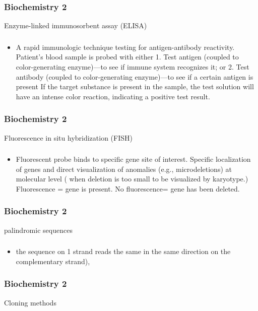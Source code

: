\documentclass[11pt]{beamer}
\begin{document}
\begin{frame}
 \frametitle{Biochemistry 2}
Enzyme-linked immunosorbent assay (ELISA)
\end{frame}

\begin{frame}
 \frametitle{}
\begin{itemize}
\item A rapid immunologic technique testing for antigen-antibody reactivity.
Patient’s blood sample is probed with either 1. Test antigen (coupled to color-generating
enzyme)––to see if immune system
recognizes it; or 2. Test antibody (coupled to color-generating
enzyme)––to see if a certain antigen is
present If the target substance is present in the sample,
the test solution will have an intense color reaction, indicating a positive test result.
\end{itemize}
\end{frame}

\begin{frame}
 \frametitle{Biochemistry 2}
Fluorescence in situ hybridization (FISH)
\end{frame}

\begin{frame}
 \frametitle{}
\begin{itemize}
\item Fluorescent probe binds to specific gene site of interest. Specific localization of genes and direct visualization of anomalies (e.g., microdeletions)
at molecular level ( when deletion is too small to be visualized by karyotype.) \\ Fluorescence = gene is present. No fluorescence= gene has been deleted. 
\end{itemize}
\end{frame}

\begin{frame}
 \frametitle{Biochemistry 2}
palindromic sequences
\end{frame}

\begin{frame}
 \frametitle{}
\begin{itemize}
\item the sequence on 1 strand reads the same in the same direction on the complementary strand),
\end{itemize}
\end{frame}

\begin{frame}
 \frametitle{Biochemistry 2}
Cloning methods
\end{frame}
\end{document}
